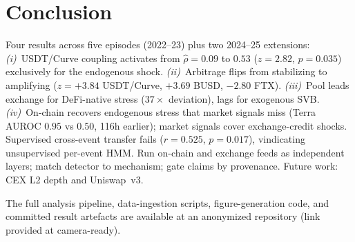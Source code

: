 \documentclass[sigconf,anonymous]{acmart}
\begin{document}
\section{Conclusion}
\label{sec:conclude}

Four results across five episodes (2022--23) plus two 2024--25 extensions:
\emph{(i)}~USDT/Curve coupling activates from $\hat{\rho}=0.09$ to $0.53$ ($z=2.82$, $p=0.035$) exclusively for the endogenous shock.
\emph{(ii)}~Arbitrage flips from stabilizing to amplifying ($z=+3.84$ USDT/Curve, $+3.69$ BUSD, $-2.80$ FTX).
\emph{(iii)}~Pool leads exchange for DeFi-native stress ($37\times$ deviation), lags for exogenous SVB.
\emph{(iv)}~On-chain recovers endogenous stress that market signals miss (Terra AUROC $0.95$ vs $0.50$, 116h earlier); market signals cover exchange-credit shocks. Supervised cross-event transfer fails ($r=0.525$, $p=0.017$), vindicating unsupervised per-event HMM.
Run on-chain and exchange feeds as independent layers; match detector to mechanism; gate claims by provenance. Future work: CEX L2 depth and Uniswap~v3.

\begin{acks}
The full analysis pipeline, data-ingestion scripts, figure-generation code,
and committed result artefacts are available at an anonymized repository
(link provided at camera-ready).
\end{acks}

{\footnotesize\setlength{\bibsep}{0pt plus 0.1ex}

}
\end{document}
